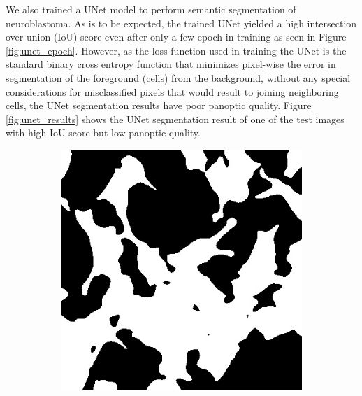 \documentclass[journal]{IEEEtran}
\begin{document}
We also trained a UNet model to perform semantic segmentation of neuroblastoma. As is to be expected, the trained UNet yielded a high intersection over union (IoU) score even after only a few epoch in training as seen in Figure \ref{fig:unet_epoch}. However, as the loss function used in training the UNet is the standard binary cross entropy function that minimizes pixel-wise the error in segmentation of the foreground (cells) from the background, without any special considerations for misclassified pixels that would result to joining neighboring cells, the UNet segmentation results have poor panoptic quality. Figure \ref{fig:unet_results} shows the UNet segmentation result of one of the test images with high IoU score but low panoptic quality.

\begin{figure}
\centering
\begin{subfigure}[b]{0.45\linewidth}
\includegraphics[width=\linewidth]{deeplab/110115.jpg}
\caption{}
\end{subfigure}
\begin{subfigure}[b]{0.45\linewidth}

\end{subfigure}
\end{figure}
\end{document}
